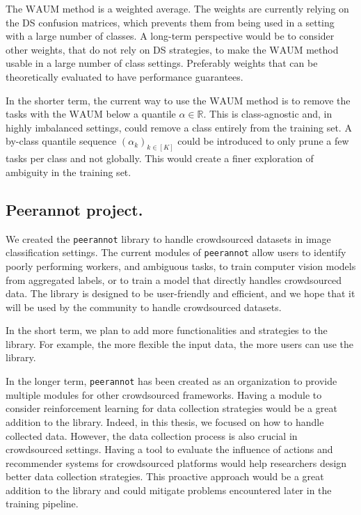 The $\mathrm{WAUM}$ method is a weighted average.
The weights are currently relying on the DS confusion matrices, which prevents them from being used in a setting with a large number of classes.
A long-term perspective would be to consider other weights, that do not rely on DS strategies, to make the $\mathrm{WAUM}$ method usable in a large number of class settings.
Preferably weights that can be theoretically evaluated to have performance guarantees.

In the shorter term, the current way to use the $\mathrm{WAUM}$ method is to remove the tasks with the $\mathrm{WAUM}$ below a quantile $\alpha\in\mathbb{R}$.
This is class-agnostic and, in highly imbalanced settings, could remove a class entirely from the training set.
A by-class quantile sequence $(\alpha_k)_{k\in [K]}$ could be introduced to only prune a few tasks per class and not globally.
This would create a finer exploration of ambiguity in the training set.

\subsection{Peerannot project.}

We created the \texttt{peerannot} library to handle crowdsourced datasets in image classification settings.
The current modules of \texttt{peerannot} allow users to identify poorly performing workers, and ambiguous tasks, to train computer vision models from aggregated labels, or to train a model that directly handles crowdsourced data.
The library is designed to be user-friendly and efficient, and we hope that it will be used by the community to handle crowdsourced datasets.

In the short term, we plan to add more functionalities and strategies to the library.
For example, the more flexible the input data, the more users can use the library.

In the longer term, \texttt{peerannot} has been created as an organization to provide multiple modules for other crowdsourced frameworks.
Having a module to consider reinforcement learning for data collection strategies would be a great addition to the library.
Indeed, in this thesis, we focused on how to handle collected data.
However, the data collection process is also crucial in crowdsourced settings.
Having a tool to evaluate the influence of actions and recommender systems for crowdsourced platforms would help researchers design better data collection strategies.
This proactive approach would be a great addition to the library and could mitigate problems encountered later in the training pipeline.

